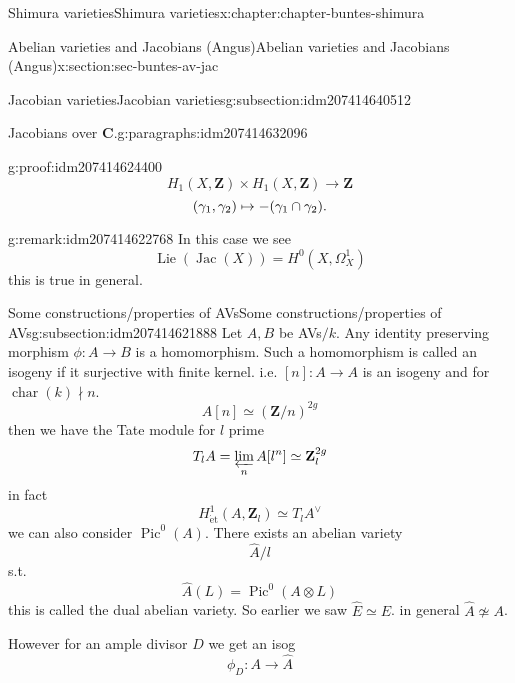 \documentclass[oneside,10pt,]{book}
\newcommand{\qedhere}{\relax}
\numberwithin{equation}{section}
\DeclareMathOperator{\Lie}{Lie}
\newcommand{\lb}{[}
\newcommand{\rb}{]}
\newcommand{\ZZ}{\mathbf{Z}}
\newcommand{\CC}{\mathbf{C}}
\newcommand{\et}{\mathrm{\acute{e}t}}
\DeclareMathOperator{\Pic}{Pic}
\DeclareMathOperator{\Jac}{Jac}
\DeclareMathOperator{\characteristic}{char}
\begin{document}
\begin{chapterptx}{Shimura varieties}{}{Shimura varieties}{}{}{x:chapter:chapter-buntes-shimura}
\begin{sectionptx}{Abelian varieties and Jacobians (Angus)}{}{Abelian varieties and Jacobians (Angus)}{}{}{x:section:sec-buntes-av-jac}
\begin{subsectionptx}{Jacobian varieties}{}{Jacobian varieties}{}{}{g:subsection:idm207414640512}
\begin{paragraphs}{Jacobians over \(\CC\).}{g:paragraphs:idm207414632096}
\begin{proofptx}{}{g:proof:idm207414624400}
\begin{equation*}
H_1(X, \ZZ) \times H_1(X, \ZZ) \to \ZZ
\end{equation*}
%
\begin{equation*}
(\gamma_1, \gamma_2) \mapsto -(\gamma_1\cap \gamma_2)\text{.}\qedhere
\end{equation*}
%
\end{proofptx}
\begin{remark}{}{g:remark:idm207414622768}%
In this case we see%
\begin{equation*}
\Lie(\Jac(X)) = H^0(X, \Omega_X^1)
\end{equation*}
this is true in general.%
\end{remark}
\end{paragraphs}%
\end{subsectionptx}
%
%
\typeout{************************************************}
\typeout{************************************************}
%
\begin{subsectionptx}{Some constructions\slash{}properties of AVs}{}{Some constructions\slash{}properties of AVs}{}{}{g:subsection:idm207414621888}
Let \(A,B\) be AVs\(/k\). Any identity preserving morphism \(\phi \colon A \to B\) is a homomorphism. Such a homomorphism is called an isogeny if it surjective with finite kernel. i.e. \(\lb n \rb \colon A \to A\) is an isogeny and for \(\characteristic(k) \nmid n\).%
\begin{equation*}
A[n] \simeq (\ZZ/n)^{2g}
\end{equation*}
then we have the Tate module for \(l\) prime%
\begin{equation*}
T_lA = \varprojlim_n A[l^n] \simeq \ZZ_l^{2g}
\end{equation*}
in fact%
\begin{equation*}
H^1_{\et} (A, \ZZ_l) \simeq T_lA ^\vee
\end{equation*}
we can also consider \(\Pic^0(A)\). There exists an abelian variety%
\begin{equation*}
\hat A/l
\end{equation*}
s.t.%
\begin{equation*}
\hat A (L) = \Pic^0(A \otimes L)
\end{equation*}
this is called the dual abelian variety. So earlier we saw \(\hat E \simeq E\). in general \(\hat A \not \simeq  A\).%
\par
However for an ample divisor \(D\) we get an isog%
\begin{equation*}
\phi_D \colon A \to \hat A
\end{equation*}

\end{subsectionptx}
\end{sectionptx}
\end{chapterptx}
\end{document}
